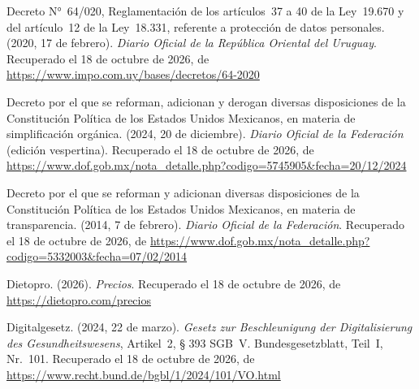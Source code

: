 \documentclass[12pt, a4paper]{article}
\begin{document}
\begin{list}{}{\setlength{\leftmargin}{1.27cm}\setlength{\itemindent}{-1.27cm}%
  \setlength{\labelwidth}{0pt}\setlength{\labelsep}{0pt}\setlength{\itemsep}{6pt}}
\item Decreto N°~64/020, Reglamentación de los artículos~37 a 40
  de la Ley~19.670 y del artículo~12 de la Ley~18.331, referente a
  protección de datos personales. (2020, 17 de febrero).
  \textit{Diario Oficial de la República Oriental del Uruguay}.
  Recuperado el 18 de octubre de 2026, de \url{https://www.impo.com.uy/bases/decretos/64-2020}
 

\item Decreto por el que se reforman, adicionan y derogan diversas
  disposiciones de la Constitución Política de los Estados Unidos
  Mexicanos, en materia de simplificación orgánica. (2024, 20 de
  diciembre). \textit{Diario Oficial de la Federación} (edición
  vespertina). Recuperado el 18 de octubre de 2026, de \url{https://www.dof.gob.mx/nota_detalle.php?codigo=5745905&fecha=20/12/2024}

\item Decreto por el que se reforman y adicionan diversas
  disposiciones de la Constitución Política de los Estados Unidos
  Mexicanos, en materia de transparencia. (2014, 7 de febrero).
  \textit{Diario Oficial de la Federación}.
  Recuperado el 18 de octubre de 2026, de \url{https://www.dof.gob.mx/nota_detalle.php?codigo=5332003&fecha=07/02/2014}
 

\item Dietopro. (2026). \textit{Precios}.
  Recuperado el 18 de octubre de 2026, de \url{https://dietopro.com/precios}

\item Digitalgesetz. (2024, 22 de marzo). \textit{Gesetz zur
  Beschleunigung der Digitalisierung des Gesundheitswesens},
  Artikel~2, § 393 SGB~V. Bundesgesetzblatt, Teil~I, Nr.~101.
  Recuperado el 18 de octubre de 2026, de \url{https://www.recht.bund.de/bgbl/1/2024/101/VO.html}



\end{list}
\end{document}
